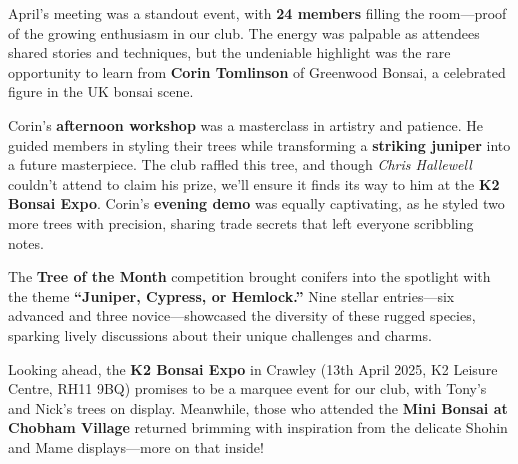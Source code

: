 \vspace*{-0.5em}
\noindent
April's meeting was a standout event, with \textbf{24 members} filling the room---proof of the growing enthusiasm in our club.
The energy was palpable as attendees shared stories and techniques, but the undeniable highlight was the rare opportunity to learn from \textbf{Corin Tomlinson} of Greenwood Bonsai, a celebrated figure in the UK bonsai scene.

\medskip
Corin's \textbf{afternoon workshop} was a masterclass in artistry and patience.
He guided members in styling their trees while transforming a \textbf{striking juniper} into a future masterpiece.
The club raffled this tree, and though \textit{Chris Hallewell} couldn't attend to claim his prize, we'll ensure it finds its way to him at the \textbf{K2 Bonsai Expo}.
Corin's \textbf{evening demo} was equally captivating, as he styled two more trees with precision, sharing trade secrets that left everyone scribbling notes.

\medskip
The \textbf{Tree of the Month} competition brought conifers into the spotlight with the theme \textbf{``Juniper, Cypress, or Hemlock.''} Nine stellar entries---six advanced and three novice---showcased the diversity of these rugged species, sparking lively discussions about their unique challenges and charms.

\medskip
Looking ahead, the \textbf{K2 Bonsai Expo} in Crawley (13th April 2025, K2 Leisure Centre, RH11 9BQ) promises to be a marquee event for our club, with Tony's and Nick's trees on display.
Meanwhile, those who attended the \textbf{Mini Bonsai at Chobham Village} returned brimming with inspiration from the delicate Shohin and Mame displays---more on that inside!

